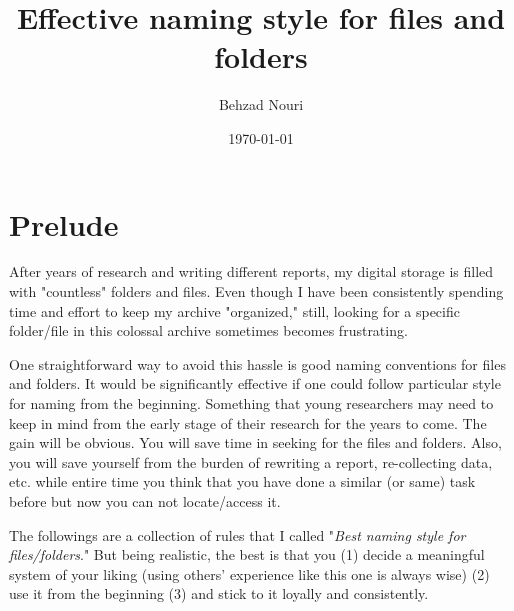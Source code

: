 \documentclass[12pt,letterpaper]{article}
\title{Effective naming style for files and folders}
\author{Behzad Nouri}
\date{\today}
\begin{document}
\maketitle
\section{Prelude}
After years of research and writing different reports, my digital storage is filled with "countless" folders and files. Even though I have been consistently spending time and effort to keep my archive "organized,"  still, looking for a specific folder/file in this colossal archive sometimes becomes  frustrating. 

One straightforward way to avoid this hassle is good naming conventions for files and folders. It would be significantly effective if one could follow particular style for naming from the beginning. Something that young researchers may need to keep in mind from the early stage of their research for the years to come. The gain will be obvious. You will save time in seeking for the files and folders. Also, you will save yourself from the burden of rewriting a report, re-collecting data, etc. while entire time you think that you have done a similar (or same) task before but now you can not locate/access it.

 The followings are a collection of rules that I called "\emph{Best naming style for files/folders}." But being realistic, the best is that you (1) decide a meaningful system of your liking (using others' experience like this one is always wise) (2) use it from the beginning (3) and stick to it loyally and consistently. 
 
 \newpage
\end{document}
